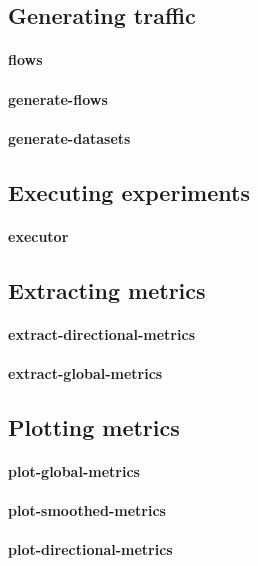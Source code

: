 \subsection{Generating traffic}

\paragraph{flows}
\paragraph{generate-flows}
\paragraph{generate-datasets}

\subsection{Executing experiments}

\paragraph{executor}

\subsection{Extracting metrics}

\paragraph{extract-directional-metrics}
\paragraph{extract-global-metrics}

\subsection{Plotting metrics}

\paragraph{plot-global-metrics}
\paragraph{plot-smoothed-metrics}
\paragraph{plot-directional-metrics}

